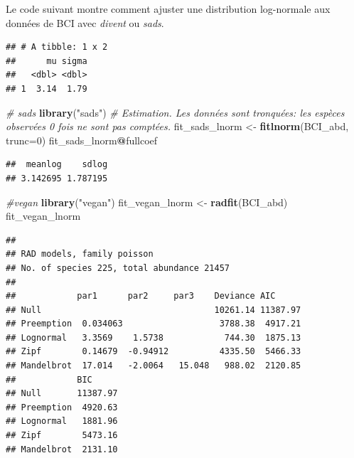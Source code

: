 \documentclass[
  11pt,
  american,
  a4paper,
  extrafontsizes,onecolumn,openright
  ]{memoir}
\newenvironment{Shaded}{\begin{snugshade}}{\end{snugshade}}
\newcommand{\AttributeTok}[1]{\textcolor[rgb]{0.13,0.29,0.53}{#1}}
\newcommand{\CommentTok}[1]{\textcolor[rgb]{0.56,0.35,0.01}{\textit{#1}}}
\newcommand{\DecValTok}[1]{\textcolor[rgb]{0.00,0.00,0.81}{#1}}
\newcommand{\FunctionTok}[1]{\textcolor[rgb]{0.13,0.29,0.53}{\textbf{#1}}}
\newcommand{\NormalTok}[1]{#1}
\newcommand{\OtherTok}[1]{\textcolor[rgb]{0.56,0.35,0.01}{#1}}
\newcommand{\SpecialCharTok}[1]{\textcolor[rgb]{0.81,0.36,0.00}{\textbf{#1}}}
\newcommand{\StringTok}[1]{\textcolor[rgb]{0.31,0.60,0.02}{#1}}
\begin{document}
Le code suivant montre comment ajuster une distribution log-normale aux données de BCI avec \emph{divent} ou \emph{sads}.

\scriptsize

\begin{Shaded}
\end{Shaded}

\begin{verbatim}
## # A tibble: 1 x 2
##      mu sigma
##   <dbl> <dbl>
## 1  3.14  1.79
\end{verbatim}

\begin{Shaded}
\begin{Highlighting}[]
\CommentTok{\# sads}
\FunctionTok{library}\NormalTok{(}\StringTok{"sads"}\NormalTok{)}
\CommentTok{\# Estimation. Les données sont tronquées: les espèces observées 0 fois ne sont pas comptées.}
\NormalTok{fit\_sads\_lnorm }\OtherTok{\textless{}{-}} \FunctionTok{fitlnorm}\NormalTok{(BCI\_abd, }\AttributeTok{trunc=}\DecValTok{0}\NormalTok{)}
\NormalTok{fit\_sads\_lnorm}\SpecialCharTok{@}\NormalTok{fullcoef}
\end{Highlighting}
\end{Shaded}

\begin{verbatim}
##  meanlog    sdlog 
## 3.142695 1.787195
\end{verbatim}

\begin{Shaded}
\begin{Highlighting}[]
\CommentTok{\#vegan}
\FunctionTok{library}\NormalTok{(}\StringTok{"vegan"}\NormalTok{)}
\NormalTok{fit\_vegan\_lnorm }\OtherTok{\textless{}{-}} \FunctionTok{radfit}\NormalTok{(BCI\_abd)}
\NormalTok{fit\_vegan\_lnorm}
\end{Highlighting}
\end{Shaded}

\begin{verbatim}
## 
## RAD models, family poisson 
## No. of species 225, total abundance 21457
## 
##            par1      par2     par3    Deviance AIC     
## Null                                  10261.14 11387.97
## Preemption  0.034063                   3788.38  4917.21
## Lognormal   3.3569    1.5738            744.30  1875.13
## Zipf        0.14679  -0.94912          4335.50  5466.33
## Mandelbrot  17.014   -2.0064   15.048   988.02  2120.85
##            BIC     
## Null       11387.97
## Preemption  4920.63
## Lognormal   1881.96
## Zipf        5473.16
## Mandelbrot  2131.10
\end{verbatim}
\end{document}

